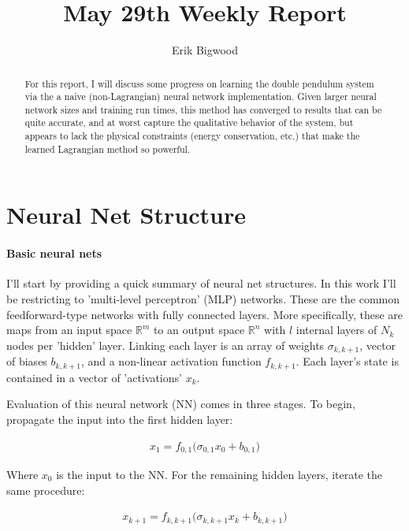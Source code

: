 \documentclass[]{article}
\title{May 29th Weekly Report}
\author{Erik Bigwood}
\begin{document}
\maketitle

\begin{abstract}
For this report, I will discuss some progress on learning the double pendulum system via the a naive (non-Lagrangian) neural network implementation. Given larger neural network sizes and training run times, this method has converged to results that can be quite accurate, and at worst capture the qualitative behavior of the system, but appears to lack the physical constraints (energy conservation, etc.) that make the learned Lagrangian method so powerful.
\end{abstract}

\tableofcontents
\newpage

\section{Neural Net Structure}

\paragraph{Basic neural nets}

I'll start by providing a quick summary of neural net structures. In this work I'll be restricting to 'multi-level perceptron' (MLP) networks\cite{Yu2021}. These are the common feedforward-type networks with fully connected layers. More specifically, these are maps from an input space $\mathbb{R}^m$ to an output space $\mathbb{R}^n$ with $l$ internal layers of $N_k$ nodes per 'hidden' layer. Linking each layer is an array of weights $\sigma_{k,k+1}$, vector of biases $b_{k,k+1}$, and a non-linear activation function $f_{k,k+1}$. Each layer's state is contained in a vector of 'activations' $x_k$.

Evaluation of this neural network (NN) comes in three stages. To begin, propagate the input into the first hidden layer:

\begin{eqnarray*}
	x_1 = f_{0,1}\Big( \sigma_{0,1}  x_0 + b_{0,1}\Big)
\end{eqnarray*}

Where $x_0$ is the input to the NN. For the remaining hidden layers, iterate the same procedure:

\begin{eqnarray*}
	x_{k+1} = f_{k,k+1}\Big( \sigma_{k,k+1}  x_k + b_{k,k+1}\Big)
\end{eqnarray*}
\end{document}
